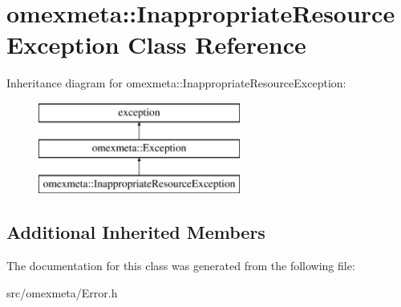 \hypertarget{classomexmeta_1_1InappropriateResourceException}{}\section{omexmeta\+:\+:Inappropriate\+Resource\+Exception Class Reference}
\label{classomexmeta_1_1InappropriateResourceException}
Inheritance diagram for omexmeta\+:\+:Inappropriate\+Resource\+Exception\+:\begin{figure}[H]
\begin{center}
\leavevmode
\includegraphics[height=3.000000cm]{classomexmeta_1_1InappropriateResourceException}
\end{center}
\end{figure}
\subsection*{Additional Inherited Members}


The documentation for this class was generated from the following file\+:\begin{DoxyCompactItemize}
\item 
src/omexmeta/Error.\+h\end{DoxyCompactItemize}
